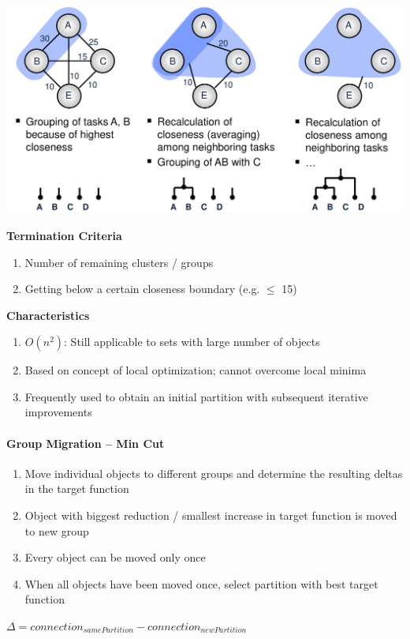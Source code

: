 \documentclass[english]{latex4ei/latex4ei_sheet}
\begin{document}
\begin{center}
  \centering
  \includegraphics[width=0.8\linewidth]{assets/HierarchicalClustering.png}
  \label{fig:hierarchicalclustering}
\end{center}

\textbf{Termination Criteria}
\begin{enumerate}
	\item Number of remaining clusters / groups
	\item Getting below a certain closeness boundary (e.g. $\leq$ 15)
\end{enumerate}

\textbf{Characteristics}
\begin{enumerate}
	\item $O(n^2)$: Still applicable to sets with large number of objects
	\item Based on concept of local optimization; cannot overcome local minima
	\item Frequently used to obtain an initial partition with subsequent iterative improvements
\end{enumerate}

\paragraph{Group Migration – Min Cut}
\begin{enumerate}
  \item Move individual objects to different groups and determine the resulting deltas in the target function
  \item Object with biggest reduction / smallest increase in target function is moved to new group
  \item Every object can be moved only once
  \item When all objects have been moved once, select partition with best target function
\end{enumerate}

$\Delta = connection_{samePartition} - connection_{newPartition}$ 
\end{document}
